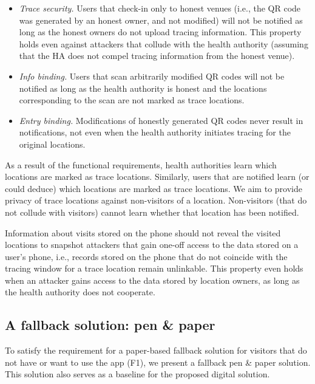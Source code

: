 \begin{itemize}[topsep=1pt, partopsep=0pt]
\item \textit{Trace security.} Users that check-in only to honest venues (i.e., the QR code was generated by an honest owner, and not modified) will not be notified as long as the honest owners do not upload tracing information. This property holds even against attackers that collude with the health authority (assuming that the HA does not compel tracing information from the honest venue).
\item \textit{Info binding.} Users that scan arbitrarily modified QR codes will not be notified as long as the health authority is honest and the locations corresponding to the scan are not marked as trace locations.
\item \textit{Entry binding.} Modifications of honestly generated QR codes never result in notifications, not even when the health authority initiates tracing for the original locations.
\end{itemize}

 As a result of the functional requirements, health authorities learn which locations are marked as trace locations. Similarly, users that are notified learn (or could deduce) which locations are marked as trace locations. We aim to provide privacy of trace locations against non-visitors of a location. Non-visitors (that do not collude with visitors) cannot learn whether that location has been notified.

 Information about visits stored on the phone should not reveal the visited locations to snapshot attackers that gain one-off access to the data stored on a user's phone, i.e., records stored on the phone that do not coincide with the tracing window for a trace location remain unlinkable.
This property even holds when an attacker gains access to the data stored by location owners, as long as the health authority does not cooperate.

\subsection{A fallback solution: pen \& paper}
To satisfy the requirement for a paper-based fallback solution for visitors that do not have or want to use the app (F1), we present a fallback pen \& paper solution. This solution also serves as a baseline for the proposed digital solution.

